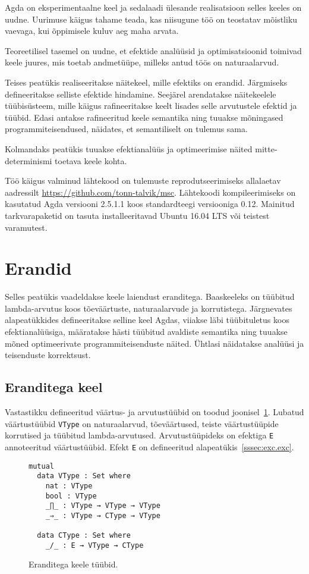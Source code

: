 \documentclass[a4paper,12pt]{article}
\begin{document}
Agda on eksperimentaalne keel ja sedalaadi ülesande realisatsioon selles keeles on uudne.
Uurimuse käigus tahame teada, kas niisugune töö on teostatav mõistliku vaevaga, kui õppimisele kuluv aeg maha arvata.

Teoreetilisel tasemel on uudne, et efektide analüüsid ja optimisatsioonid toimivad keele juures, mis toetab andmetüüpe, milleks antud töös on naturaalarvud. 

Teises peatükis realiseeritakse näitekeel, mille efektiks on erandid.
Järgmiseks defineeritakse selliste efektide hindamine.
Seejärel arendatakse näitekeelele tüübisüsteem, mille käigus rafineeritakse keelt lisades selle arvutustele efektid ja tüübid.
Edasi antakse rafineeritud keele semantika ning tuuakse mõningased programmiteisendused, näidates, et semantiliselt on tulemus sama.

Kolmandaks peatükis tuuakse efektianalüüs ja optimeerimise näited mitte-determinismi toetava keele kohta.

Töö käigus valminud lähtekood on tulemuste reprodutseerimiseks allalaetav aadressilt \url{https://github.com/tonn-talvik/msc}.
Lähtekoodi kompileerimiseks on kasutatud Agda versiooni 2.5.1.1 koos standardteegi versiooniga 0.12.
Mainitud tarkvarapaketid on tasuta installeeritavad Ubuntu 16.04 LTS või teistest varamutest.

\clearpage

\section{Erandid}

Selles peatükis vaadeldakse keele laiendust eranditega. 
Baaskeeleks on tüübitud lambda-arvutus koos tõeväärtuste, naturaalarvude ja korrutistega.
Järgnevates alapeatükkides defineeritakse selline keel Agdas,
viiakse läbi tüübituletus koos efektianalüüsiga,
määratakse hästi tüübitud avaldiste semantika
ning tuuakse mõned optimeerivate programmiteisenduste näited.
Ühtlasi näidatakse analüüsi ja teisenduste korrektsust.

\subsection{Eranditega keel}\label{ssec:exc.raw}

Vastastikku defineeritud väärtus- ja arvutustüübid on toodud joonisel~\ref{fig:exc.types}.
Lubatud väärtustüübid {\tt VType} on naturaalarvud, tõeväärtused, teiste väärtustüüpide korrutised ja tüübitud lambda-arvutused.
Arvutustüüpideks on efektiga {\tt E} annoteeritud väärtustüübid. Efekt {\tt E} on defineeritud alapeatükis~\ref{sssec:exc.exc}.
\begin{figure}
  \begin{BVerbatim}
mutual
  data VType : Set where
    nat : VType
    bool : VType
    _∏_ : VType → VType → VType
    _⇒_ : VType → CType → VType

  data CType : Set where
    _/_ : E → VType → CType
  \end{BVerbatim}
  \caption{Eranditega keele tüübid.}
  \label{fig:exc.types}
\end{figure}
\end{document}
